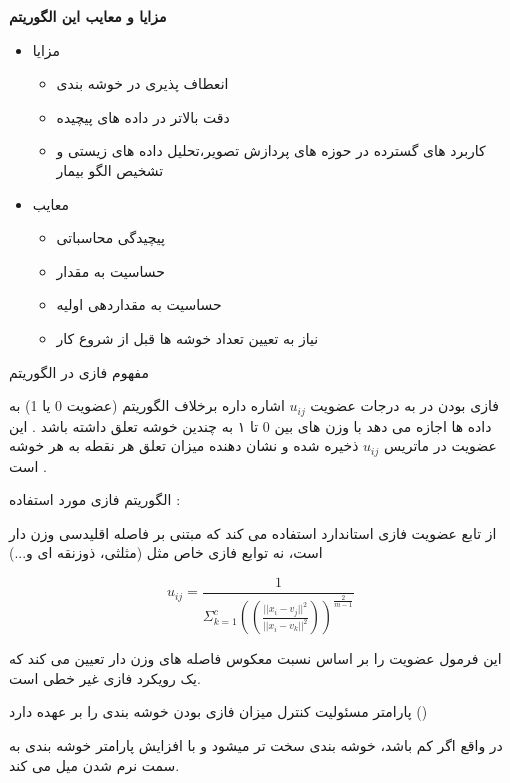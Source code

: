\documentclass[10pt]{beamer}
\begin{document}
\begin{frame}{}
	\textbf{مزایا و معایب  این الگوریتم}
	
\begin{itemize}
	\item {مزایا}
	

\begin{footnotesize}
\begin{itemize}
\item 
انعطاف پذیری در خوشه بندی 
\item 
دقت بالاتر در داده های پیچیده
\item 
کاربرد های گسترده در حوزه های پردازش تصویر،تحلیل داده های زیستی و تشخیص الگو بیمار
\end{itemize}
\end{footnotesize}


	\item {معایب}

	\begin{footnotesize}
	\begin{itemize}	
		\item 
	پیچیدگی محاسباتی
		\item 
	حساسیت به مقدار 
		\item 
حساسیت به مقداردهی اولیه
		\item 
نیاز به تعیین تعداد خوشه ها قبل از شروع کار
\end{itemize}
\end{footnotesize}
\end{itemize}
\end{frame}	
	
\begin{frame}{}
	مفهوم فازی در الگوریتم \lr{fuzzy c-means}

\begin{footnotesize}
فازی بودن در  به درجات عضویت $u_{ij}$ اشاره داره برخلاف الگوریتم  (عضویت 0 یا  1) به داده ها اجازه می دهد با وزن های بین 0 تا ۱ به چندین خوشه تعلق داشته باشد . این عضویت در ماتریس $u_{ij}$ ذخیره شده و نشان دهنده میزان تعلق هر نقطه به هر خوشه است .

الگوریتم فازی مورد استفاده :

از تابع عضویت فازی استاندارد استفاده می کند که مبتنی بر فاصله اقلیدسی وزن دار است، نه توابع فازی خاص مثل (مثلثی، ذوزنقه ای و...)
\end{footnotesize}
\[
u_{ij}= \frac{1}{\Sigma_{k=1}^{c}((\frac{||x_i-v_j||^2}{||x_i-v_k||^2}))^\frac{2}{m-1}}
\]
 \begin{scriptsize}
این فرمول عضویت را بر اساس نسبت معکوس فاصله های وزن دار تعیین می کند که یک رویکرد فازی غیر خطی است.

پارامتر  مسئولیت کنترل میزان فازی بودن خوشه بندی را بر عهده دارد ()

در واقع اگر  کم باشد، خوشه بندی سخت تر میشود و با افزایش پارامتر  خوشه بندی به سمت نرم شدن میل می کند.
 \end{scriptsize}
\end{frame}	
\end{document}
